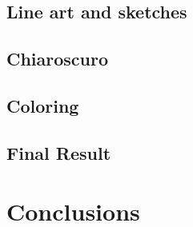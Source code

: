 \documentclass{cup-pan}
\begin{document}
    \subsection{Line art and sketches}

    \subsection{Chiaroscuro}

    \subsection{Coloring}

    \subsection{Final Result}
    \newpage
\newpage
\section{Conclusions}

\newpage
\end{document}
